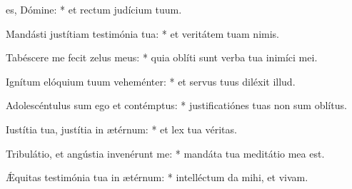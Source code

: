 \begin{psalmus}

 es, Dómine: * et rectum judícium tuum.

Mandásti justítiam testimónia tua: * et veritátem tuam nimis.

Tabéscere me fecit zelus meus: * quia oblíti sunt verba tua inimíci mei.

Ignítum elóquium tuum veheménter: * et servus tuus diléxit illud.

Adolescéntulus sum ego et contémptus: * justificatiónes tuas non sum oblítus.

Iustítia tua, justítia in ætérnum: * et lex tua véritas.

Tribulátio, et angústia invenérunt me: * mandáta tua meditátio mea est.

Ǽquitas testimónia tua in ætérnum: * intelléctum da mihi, et vivam.

\end{psalmus}
